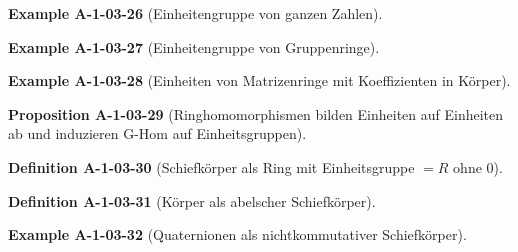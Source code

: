 \documentclass[10pt, letterpaper]{article}
\newcommand{\CustomHeading}[3]{%
  \par\medskip\noindent%
  \textbf{#1 #2} \textnormal{(#3)}.\enskip%
}
\newenvironment{DEF}[2]{\CustomHeading{Definition}{#1}{#2}}{}
\newenvironment{PROP}[2]{\CustomHeading{Proposition}{#1}{#2}}{}
\newenvironment{EXA}[2]{\CustomHeading{Example}{#1}{#2}}{}
\begin{document}

\begin{EXA}{A-1-03-26}{Einheitengruppe von ganzen Zahlen}
\end{EXA}


\begin{EXA}{A-1-03-27}{Einheitengruppe von Gruppenringe}
\end{EXA}


\begin{EXA}{A-1-03-28}{Einheiten von Matrizenringe mit Koeffizienten in Körper}
\end{EXA}


\begin{PROP}{A-1-03-29}{Ringhomomorphismen bilden Einheiten auf Einheiten ab und induzieren G-Hom auf Einheitsgruppen}
\end{PROP}


\begin{DEF}{A-1-03-30}{Schiefkörper als Ring mit Einheitsgruppe $= R$ ohne $0$}
\end{DEF}


\begin{DEF}{A-1-03-31}{Körper als abelscher Schiefkörper}
\end{DEF}


\begin{EXA}{A-1-03-32}{Quaternionen als nichtkommutativer Schiefkörper}
\end{EXA}
\end{document}

